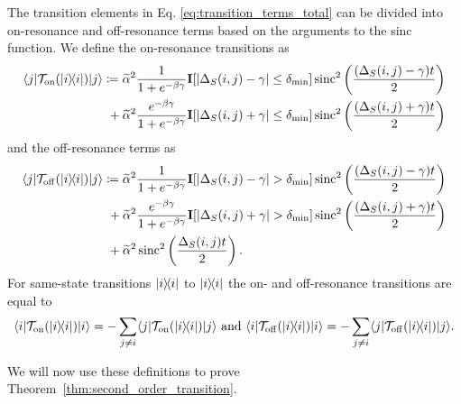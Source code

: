 \begin{definition}\label{def:transition}
The transition elements in Eq. \eqref{eq:transition_terms_total} can be divided into on-resonance and off-resonance terms based on the arguments to the sinc function. We define the on-resonance transitions as
\begin{align}
    \langle j| \mathcal{T}_{\rm on}(| i\rangle\! \langle i|)|j\rangle &\coloneqq \widetilde{\alpha}^2 \frac{1}{1 + e^{-\beta \gamma}} \mathbf{I}[|\Delta_S(i,j) - \gamma| \le \delta_{\min}]  \operatorname{sinc}^2\left(\frac{(\Delta_S(i,j) - \gamma)t}{2}\right) \nonumber \\
    &~+ \widetilde{\alpha}^2 \frac{e^{-\beta \gamma}}{1 + e^{-\beta \gamma}} \mathbf{I}[|\Delta_S(i,j) + \gamma| \le \delta_{\min}]  \operatorname{sinc}^2\left(\frac{(\Delta_S(i,j) + \gamma)t}{2}\right) \label{eq:on_resonance}
\end{align}
and the off-resonance terms as
\begin{equation}
\begin{split}
    \langle j| \mathcal{T}_{\rm off}(| i\rangle\! \langle i|)|j\rangle &\coloneqq \widetilde{\alpha}^2 \frac{1}{1 + e^{-\beta \gamma}} \mathbf{I}[|\Delta_S(i,j) - \gamma| > \delta_{\min}]  \operatorname{sinc}^2\left(\frac{(\Delta_S(i,j) - \gamma)t}{2}\right)  \\
    &~+ \widetilde{\alpha}^2 \frac{e^{-\beta \gamma}}{1 + e^{-\beta \gamma}} \mathbf{I}[|\Delta_S(i,j) + \gamma| > \delta_{\min}]  \operatorname{sinc}^2\left(\frac{(\Delta_S(i,j) + \gamma)t}{2}\right)  \\
    &~+ \widetilde{\alpha}^2 \operatorname{sinc}^2 \left( \frac{\Delta_S(i,j)t}{2} \right). \label{eq:off_resonance}
    \end{split}
\end{equation}
For same-state transitions $| i\rangle\! \langle i|$ to $| i\rangle\! \langle i|$ the on- and off-resonance transitions are equal to
\begin{equation}
    \langle i| \mathcal{T}_{\rm on}(| i\rangle\! \langle i|) |i\rangle = - \sum_{j \neq i}\langle j| \mathcal{T}_{\rm on}(| i\rangle\! \langle i|) |j\rangle \text{ and } \langle i| \mathcal{T}_{\rm off}(| i\rangle\! \langle i|) |i\rangle = - \sum_{j \neq i}\langle j| \mathcal{T}_{\rm off}(| i\rangle\! \langle i|) |j\rangle. \label{eq:same_state_transition_resonances}
\end{equation}
\end{definition}
We will now use these definitions to prove Theorem~\ref{thm:second_order_transition}.
